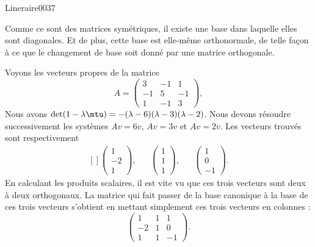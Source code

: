\begin{corrige}{Lineraire0037}

	Comme ce sont des matrices symétriques, il existe une base dans laquelle elles sont diagonales. Et de plus, cette base est elle-même orthonormale, de telle façon à ce que le changement de base soit donné par une matrice orthogonale.

	Voyons les vecteurs propres de la matrice
	\begin{equation}
		A=\begin{pmatrix}
			3	&	-1	&	1	\\
			-1	&	5	&	-1	\\
			1	&	-1	&	3
		\end{pmatrix},
	\end{equation}
	Nous avons $\det(1-\lambda\mtu)=-(\lambda-6)(\lambda-3)(\lambda-2)$. Nous devons résoudre successivement les systèmes $Av=6v$, $Av=3v$ et $Av=2v$. Les vecteurs trouvés sont respectivement
	\begin{equation}
		\begin{aligned}[]
			\begin{pmatrix}
				1	\\ 
				-2	\\ 
				1	
			\end{pmatrix},
			&&\begin{pmatrix}
				1	\\ 
				1	\\ 
				1	
			\end{pmatrix},&&\begin{pmatrix}
				1	\\ 
				0	\\ 
				-1	
			\end{pmatrix}.
		\end{aligned}
	\end{equation}
	En calculant les produits scalaires, il est vite vu que ces trois vecteurs sont deux à deux orthogonaux. La matrice qui fait passer de la base canonique à la base de ces trois vecteurs s'obtient en mettant simplement ces trois vecteurs en colonnes :
	\begin{equation}
		\begin{pmatrix}
			1	&	1	&	1	\\
			-2	&	1	&	0	\\
			1	&	1	&	-1
		\end{pmatrix}.
	\end{equation}

\end{corrige}
